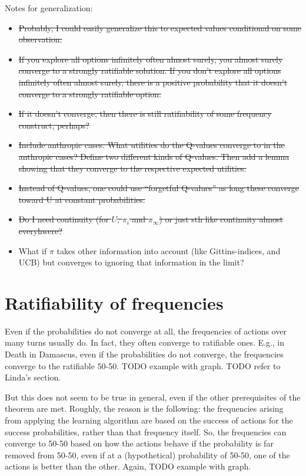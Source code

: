 \documentclass{article}
\begin{document}
Notes for generalization:
\begin{itemize}
\item \sout{Probably, I could easily generalize this to expected values conditional on some observation.}
\item \sout{If you explore all options infinitely often almost surely, you almost surely converge to a strongly ratifiable solution. If you don't explore all options infinitely often almost surely, there is a positive probability that it doesn't converge to a strongly ratifiable option.}
\item \sout{If it doesn't converge, then there is still ratifiability of some frequency construct, perhaps?}
\item \sout{Include anthropic cases. What utilities do the Q-values converge to in the anthropic cases? Define two different kinds of Q-values. Then add a lemma showing that they converge to the respective expected utilities.}
\item \sout{Instead of Q-values, one could use ``forgetful Q-values'' as long these converge toward U at constant probabilities.}
\item \sout{Do I need continuity (for $U$, $\pi_i$ and $\pi_\infty$) or just sth like continuity almost everyhwere?}
\item What if $\pi$ takes other information into account (like Gittins-indices, and UCB) but converges to ignoring that information in the limit?
\end{itemize}

\section*{Ratifiability of frequencies}

Even if the probabilities do not converge at all, the frequencies of actions over many turns usually do. In fact, they often converge to ratifiable ones.  E.g., in Death in Damascus, even if the probabilities do not converge, the frequencies converge to the ratifiable 50-50. TODO example with graph. TODO refer to Linda's section.

But this does not seem to be true in general, even if the other prerequisites of the theorem are met. Roughly, the reason is the following: the frequencies arising from applying the learning algorithm are based on the success of actions for the success probabilities, rather than that frequency itself. So, the frequencies can converge to 50-50 based on how the actions behave if the probability is far removed from 50-50, even if at a (hypothetical) probability of 50-50, one of the actions is better than the other. Again, TODO example with graph.
\end{document}
